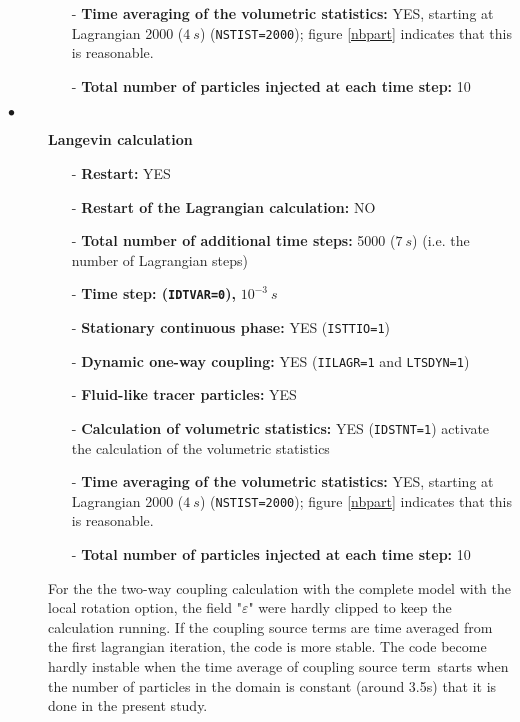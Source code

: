 \begin{description}
\begin{itemize}
            \item[-] {\bf Time averaging of the volumetric statistics:} YES, starting at Lagrangian 2000 ($4~s$) (\texttt{NSTIST=2000}); figure \ref{nbpart} indicates that this is reasonable.
            \item[-] {\bf Total number of particles injected at each time step:} 10
         \end{itemize}
         
   \item[$\bullet$]\textbf{Langevin calculation}
         \begin{itemize}
            \item[-] {\bf Restart:} YES
            \item[-] {\bf Restart of the Lagrangian calculation:} NO
            \item[-] {\bf Total number of additional time steps:} 5000 ($7~s$)
                  (i.e. the number of Lagrangian steps)
            \item[-] {\bf Time step: (\texttt{IDTVAR=0}),} $10^{-3}~s$
            \item[-] \textbf{Stationary continuous phase:} YES (\texttt{ISTTIO=1})
            \item[-] {\bf Dynamic one-way coupling:} YES (\texttt{IILAGR=1} and \texttt{LTSDYN=1})
            \item[-] {\bf Fluid-like tracer particles:} YES
            \item[-] {\bf Calculation of volumetric statistics:} YES
                  (\texttt{IDSTNT=1}) activate the calculation of the volumetric statistics
            \item[-] {\bf Time averaging of the volumetric statistics:} YES, starting at Lagrangian 2000 ($4~s$) (\texttt{NSTIST=2000}); figure \ref{nbpart} indicates that this is reasonable.
            \item[-] {\bf Total number of particles injected at each time step:} 10
         \end{itemize}

For the the two-way coupling calculation with the complete model with the local rotation option, the field "$\varepsilon$" were hardly clipped to keep the calculation running. If the coupling source terms are time averaged from the first lagrangian iteration, the code is more stable. The code become hardly instable when the time average of coupling source term starts when the number of particles in the domain is constant (around 3.5s) that it is done in the present study.


\end{description}

